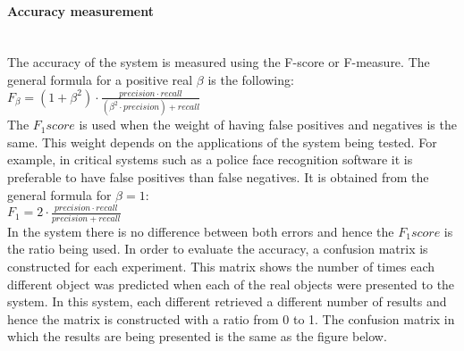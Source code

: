 
		\paragraph{Accuracy measurement}\mbox{}\\


		The accuracy of the system is measured using the F-score or F-measure. 
		The general formula for a positive real $\beta$ is the following: 
		\\

		$F_\beta=(1+\beta^2)\cdot\frac{precision \cdot recall}{(\beta^2 \cdot precision )+recall}$
		\\



		


		The $F_1 score$ is used when the weight of having false positives and negatives is the same. 
		This weight depends on the applications of the system being tested. 
		For example, in critical systems such as a police face recognition software it is preferable to have false positives than false negatives. 
		It is obtained from the general formula for $\beta=1$: 	
		\\

		$F_1=2\cdot\frac{precision \cdot recall}{precision + recall}$
		\\

		In the system there is no difference between both errors and hence the $F_1 score$ is the ratio being used. 
		In order to evaluate the accuracy, a confusion matrix is constructed for each experiment. 
		This matrix shows the number of times each different object was predicted when each of the real objects were presented to the system. 
		In this system, each different retrieved a different number of results and hence the matrix is constructed with a ratio from 0 to 1. 
		The confusion matrix in which the results are being presented is the same as the figure below. 


